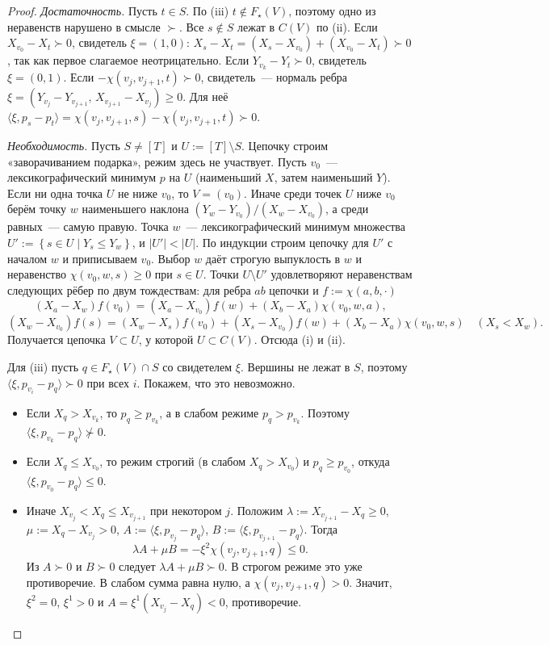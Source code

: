 \documentclass[a4paper,11pt]{article}
\theoremstyle{plain}
\theoremstyle{definition}
\theoremstyle{remark}
\newcommand{\abs}[1]{\left\lvert #1 \right\rvert}
\newcommand{\set}[1]{\left\{ #1 \right\}}
\newcommand{\ip}[2]{\langle #1, #2\rangle}
\newcommand{\gs}{\mathrel{\succ}}
\newcommand{\ngs}{\mathrel{\not\succ}}
\begin{document}
\begin{proof}
    \emph{Достаточность.} Пусть $t\in S$. По (iii) $t\notin F_\star(V)$, поэтому одно из неравенств нарушено в смысле $\gs$. Все $s\notin S$ лежат в $C(V)$ по (ii). Если $X_{v_0}-X_t\gs0$, свидетель $\xi=(1,0)$: $X_s-X_t=(X_s-X_{v_0})+(X_{v_0}-X_t)\gs0$, так как первое слагаемое неотрицательно. Если $Y_{v_k}-Y_t\gs0$, свидетель $\xi=(0,1)$. Если $-\chi(v_j,v_{j+1},t)\gs0$, свидетель~--- нормаль ребра $\xi=(Y_{v_j}-Y_{v_{j+1}},\,X_{v_{j+1}}-X_{v_j})\ge0$. Для неё $\ip{\xi}{p_s-p_t}=\chi(v_j,v_{j+1},s)-\chi(v_j,v_{j+1},t)\gs0$.

    \emph{Необходимость.} Пусть $S\ne[T]$ и $U:=[T]\setminus S$. Цепочку строим «заворачиванием подарка», режим здесь не участвует. Пусть $v_0$~--- лексикографический минимум $p$ на $U$ (наименьший $X$, затем наименьший $Y$). Если ни одна точка $U$ не ниже $v_0$, то $V=(v_0)$. Иначе среди точек $U$ ниже $v_0$ берём точку $w$ наименьшего наклона $(Y_w-Y_{v_0})/(X_w-X_{v_0})$, а среди равных~--- самую правую. Точка $w$~--- лексикографический минимум множества $U':=\set{s\in U\mid Y_s\le Y_w}$, и $\abs{U'}<\abs U$. По индукции строим цепочку для $U'$ с началом $w$ и приписываем $v_0$. Выбор $w$ даёт строгую выпуклость в $w$ и неравенство $\chi(v_0,w,s)\ge0$ при $s\in U$. Точки $U\setminus U'$ удовлетворяют неравенствам следующих рёбер по двум тождествам: для ребра $ab$ цепочки и $f:=\chi(a,b,\cdot)$
    \[
        (X_a-X_w)f(v_0)=(X_a-X_{v_0})f(w)+(X_b-X_a)\chi(v_0,w,a),
    \]
    \[
        (X_w-X_{v_0})f(s)=(X_w-X_s)f(v_0)+(X_s-X_{v_0})f(w)+(X_b-X_a)\chi(v_0,w,s)\quad(X_s<X_w).
    \]
    Получается цепочка $V\subset U$, у которой $U\subset C(V)$. Отсюда (i) и (ii).

    Для (iii) пусть $q\in F_\star(V)\cap S$ со свидетелем $\xi$. Вершины не лежат в $S$, поэтому $\ip{\xi}{p_{v_i}-p_q}\gs0$ при всех $i$. Покажем, что это невозможно.
    \begin{itemize}
        \item Если $X_q>X_{v_k}$, то $p_q\ge p_{v_k}$, а в слабом режиме $p_q>p_{v_k}$. Поэтому $\ip{\xi}{p_{v_k}-p_q}\ngs0$.
        \item Если $X_q\le X_{v_0}$, то режим строгий (в слабом $X_q>X_{v_0}$) и $p_q\ge p_{v_0}$, откуда $\ip{\xi}{p_{v_0}-p_q}\le0$.
        \item Иначе $X_{v_j}<X_q\le X_{v_{j+1}}$ при некотором $j$. Положим $\lambda:=X_{v_{j+1}}-X_q\ge0$, $\mu:=X_q-X_{v_j}>0$, $A:=\ip{\xi}{p_{v_j}-p_q}$, $B:=\ip{\xi}{p_{v_{j+1}}-p_q}$. Тогда
        \[
            \lambda A+\mu B=-\xi^2\chi(v_j,v_{j+1},q)\le0.
        \]
        Из $A\gs0$ и $B\gs0$ следует $\lambda A+\mu B\gs0$. В строгом режиме это уже противоречие. В слабом сумма равна нулю, а $\chi(v_j,v_{j+1},q)>0$. Значит, $\xi^2=0$, $\xi^1>0$ и $A=\xi^1(X_{v_j}-X_q)<0$, противоречие.
    \end{itemize}
\end{proof}
\end{document}
